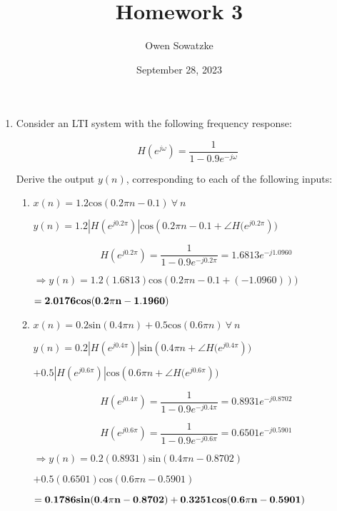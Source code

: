 \documentclass[fleqn]{article}
\title{Homework 3}
\author{Owen Sowatzke}
\date{September 28, 2023}
\makeatletter
\newcommand{\zerodisplayskip}{
	\setlength{\abovedisplayskip}{0pt}%
	\setlength{\belowdisplayskip}{0pt}%
	\setlength{\abovedisplayshortskip}{0pt}%
	\setlength{\belowdisplayshortskip}{0pt}%
	\setlength{\mathindent}{0pt}}
\newenvironment{equationCenter}{\@fleqnfalse\begin{equation*}}{\end{equation*}}
\makeatother
\begin{document}
	\offinterlineskip
	\setlength{\lineskip}{12pt}
	\zerodisplayskip
	\maketitle
	
	\begin{enumerate}[nolistsep]
		\item Consider an LTI system with the following frequency response:
		
		\begin{equationCenter}
			H(e^{j\omega}) = \frac{1}{1 - 0.9e^{-j\omega}}
		\end{equationCenter}
		
		Derive the output $y(n)$, corresponding to each of the following inputs:
		
		\begin{enumerate}[nolistsep]	
			\item $x(n) = 1.2\text{cos}(0.2{\pi}n - 0.1)\ \forall\ n$
				
				$y(n) = 1.2|H(e^{j0.2\pi})|\text{cos}(0.2{\pi}n - 0.1 + \angle{H(e^{j0.2\pi}}))$
				
				\begin{equation*}
					H(e^{j0.2\pi}) = \frac{1}{1-0.9e^{-j0.2\pi}} = 1.6813e^{-j1.0960}
				\end{equation*}
				
				$\Rightarrow y(n) = 1.2(1.6813)\text{cos}(0.2{\pi}n - 0.1 + (-1.0960)))$
				
				$\mathbf{= 2.0176\text{\textbf{cos}}(0.2{\pi}n - 1.1960)}$
				
			\item $x(n) = 0.2\text{sin}(0.4{\pi}n) + 0.5\text{cos}(0.6{\pi}n)\ \forall\ n$
			
				$y(n) = 0.2|H(e^{j0.4\pi})|\text{sin}(0.4{\pi}n + \angle{H(e^{j0.4\pi}}))$
				
				$ + 0.5|H(e^{j0.6\pi})|\text{cos}(0.6{\pi}n + \angle{H(e^{j0.6\pi}}))$
				
				\begin{equation*}
					H(e^{j0.4\pi}) = \frac{1}{1-0.9e^{-j0.4\pi}} = 0.8931e^{-j0.8702}
				\end{equation*}
				
				\begin{equation*}
					H(e^{j0.6\pi}) = \frac{1}{1-0.9e^{-j0.6\pi}} = 0.6501e^{-j0.5901}
				\end{equation*}
				
				$\Rightarrow y(n) = 0.2(0.8931)\text{sin}(0.4{\pi}n - 0.8702)$
				
				$ + 0.5(0.6501)\text{cos}(0.6{\pi}n - 0.5901)$
				
				$ \mathbf{= 0.1786\text{\textbf{sin}}(0.4{\pi}n - 0.8702) + 0.3251\text{\textbf{cos}}(0.6{\pi}n - 0.5901)}$
		\end{enumerate}
	\end{enumerate}
\end{document}
